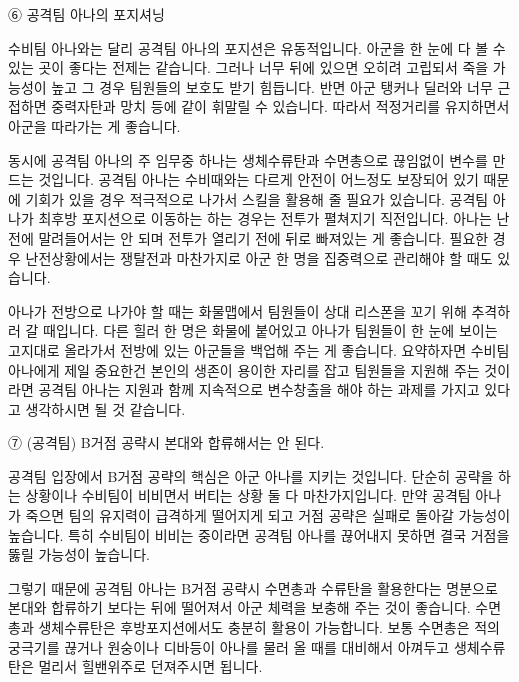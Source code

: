  

⑥ 공격팀 아나의 포지셔닝

수비팀 아나와는 달리 공격팀 아나의 포지션은 유동적입니다. 아군을 한 눈에 다 볼 수 있는 곳이 좋다는 전제는 같습니다. 그러나 너무 뒤에 있으면 오히려 고립되서 죽을 가능성이 높고 그 경우 팀원들의 보호도 받기 힘듭니다. 반면 아군 탱커나 딜러와 너무 근접하면 중력자탄과 망치 등에 같이 휘말릴 수 있습니다. 따라서 적정거리를 유지하면서 아군을 따라가는 게 좋습니다.

 

동시에 공격팀 아나의 주 임무중 하나는 생체수류탄과 수면총으로 끊임없이 변수를 만드는 것입니다. 공격팀 아나는 수비때와는 다르게 안전이 어느정도 보장되어 있기 때문에 기회가 있을 경우 적극적으로 나가서 스킬을 활용해 줄 필요가 있습니다. 공격팀 아나가 최후방 포지션으로 이동하는 하는 경우는 전투가 펼쳐지기 직전입니다. 아나는 난전에 말려들어서는 안 되며 전투가 열리기 전에 뒤로 빠져있는 게 좋습니다. 필요한 경우 난전상황에서는 쟁탈전과 마찬가지로 아군 한 명을 집중력으로 관리해야 할 때도 있습니다.

 

아나가 전방으로 나가야 할 때는 화물맵에서 팀원들이 상대 리스폰을 꼬기 위해 추격하러 갈 때입니다. 다른 힐러 한 명은 화물에 붙어있고 아나가 팀원들이 한 눈에 보이는 고지대로 올라가서 전방에 있는 아군들을 백업해 주는 게 좋습니다. 요약하자면 수비팀 아나에게 제일 중요한건 본인의 생존이 용이한 자리를 잡고 팀원들을 지원해 주는 것이라면 공격팀 아나는 지원과 함께 지속적으로 변수창출을 해야 하는 과제를 가지고 있다고 생각하시면 될 것 같습니다.

 

⑦ (공격팀) B거점 공략시 본대와 합류해서는 안 된다.

공격팀 입장에서 B거점 공략의 핵심은 아군 아나를 지키는 것입니다. 단순히 공략을 하는 상황이나 수비팀이 비비면서 버티는 상황 둘 다 마찬가지입니다. 만약 공격팀 아나가 죽으면 팀의 유지력이 급격하게 떨어지게 되고 거점 공략은 실패로 돌아갈 가능성이 높습니다. 특히 수비팀이 비비는 중이라면 공격팀 아나를 끊어내지 못하면 결국 거점을 뚫릴 가능성이 높습니다.

 

그렇기 때문에 공격팀 아나는 B거점 공략시 수면총과 수류탄을 활용한다는 명분으로 본대와 합류하기 보다는 뒤에 떨어져서 아군 체력을 보충해 주는 것이 좋습니다. 수면총과 생체수류탄은 후방포지션에서도 충분히 활용이 가능합니다. 보통 수면총은 적의 궁극기를 끊거나 원숭이나 디바등이 아나를 물러 올 때를 대비해서 아껴두고 생체수류탄은 멀리서 힐밴위주로 던져주시면 됩니다.

 

